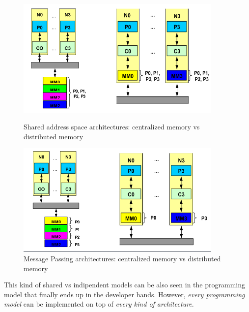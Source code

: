 \documentclass[10pt,a4paper]{article}
\begin{document}
			\begin{figure}[H]
				\centering
				\begin{minipage}{0.45\textwidth}
					\centering
					\includegraphics[width=0.9\textwidth]{./images/sharedMemory.png}
					\caption{Shared address space architectures: centralized memory vs distributed memory}
				\end{minipage}\hfill
				\begin{minipage}{0.45\textwidth}
					\centering
					\includegraphics[width=0.9\textwidth]{./images/messagePassing.png}
					\caption{Message Passing architectures: centralized memory vs distributed memory}
				\end{minipage}
			\end{figure}
			This kind of shared vs indipendent models can be also seen in the programming model that finally ends up in the developer hands. However, \emph{every programming model} can be implemented on top of \emph{every kind of architecture}.
			
\end{document}
